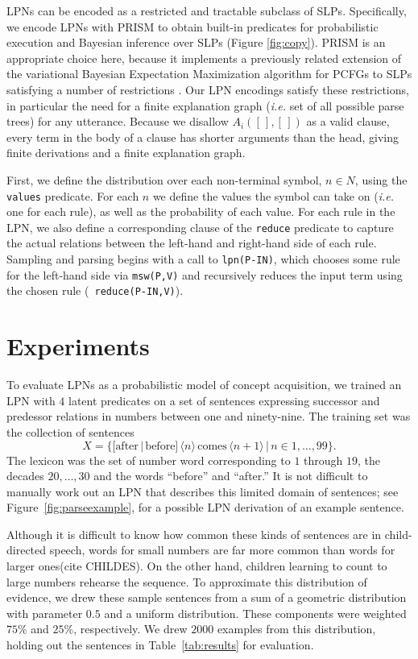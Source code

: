 \documentclass[10pt, twocolumn]{article}
\begin{document}
LPNs can be encoded as a restricted and tractable subclass of
SLPs. Specifically, we encode LPNs with PRISM to obtain built-in
predicates for probabilistic execution and Bayesian inference over
SLPs (Figure \ref{fig:copy}). PRISM is an appropriate choice here,
because it implements a previously related extension of the
variational Bayesian Expectation Maximization algorithm for PCFGs to
SLPs satisfying a number of restrictions
\cite{cussens2001parameter}. Our LPN encodings satisfy these
restrictions, in particular the need for a finite explanation graph
({\it i.e.} set of all possible parse trees) for any
utterance. Because we disallow $A_i([\,],[\,])$ as a valid clause,
every term in the body of a clause has shorter arguments than the
head, giving finite derivations and a finite explanation graph.

First, we define the distribution over each non-terminal symbol, $n
\in N$, using the {\tt values} predicate. For each $n$ we define the
values the symbol can take on ({\it i.e.} one for each rule), as well
as the probability of each value. For each rule in the LPN, we also
define a corresponding clause of the {\tt reduce} predicate to capture
the actual relations between the left-hand and right-hand side of each
rule. Sampling and parsing begins with a call to {\tt lpn(P-IN)},
which chooses some rule for the left-hand side via {\tt msw(P,V)} and
recursively reduces the input term using the chosen rule ({\tt
reduce(P-IN,V)}).

\section{Experiments}

To evaluate LPNs as a probabilistic model of concept acquisition, we
trained an LPN with $4$ latent predicates on a set of sentences
expressing successor and predessor relations in numbers between one
and ninety-nine. The training set was the collection of sentences $$X
= \{[\text{after}\, | \, \text{before}] \, \langle n \rangle \,
\text{comes} \, \langle n+1 \rangle \,|\, n \in 1,\dots,99\}.$$ The
lexicon was the set of number word corresponding to $1$ through $19$,
the decades $20, \dots, 30$ and the words ``before'' and ``after.'' It
is not difficult to manually work out an LPN that describes this
limited domain of sentences; see Figure~\ref{fig:parseexample}, for a
possible LPN derivation of an example sentence.

Although it is difficult to know how common these kinds of sentences
are in child-directed speech, words for small numbers are far more
common than words for larger ones(cite CHILDES). On the other hand,
children learning to count to large numbers rehearse the sequence. To
approximate this distribution of evidence, we drew these sample
sentences from a sum of a geometric distribution with parameter $0.5$
and a uniform distribution. These components were weighted $75\%$ and
$25\%$, respectively. We drew $2000$ examples from this distribution,
holding out the sentences in Table~\ref{tab:results} for
evaluation. 
\end{document}
